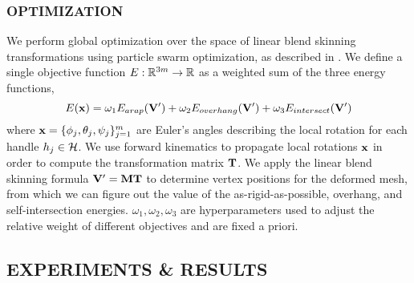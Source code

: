 



\subsubsection*{OPTIMIZATION}

We perform global optimization over the space of linear blend skinning transformations using particle swarm optimization, as described in \cite{jacobson_matryoshka_2017}. We define a single objective function $E: \mathbb{R}^{3m} \to \mathbb{R}$ as a weighted sum of the three energy functions,
\[
    E(\mathbf{x}) = \omega_1 E_{arap}(\mathbf{V}') + \omega_2 E_{overhang}(\mathbf{V}') + \omega_3 E_{intersect}(\mathbf{V}')
\]
where $\mathbf{x} = \{ \phi_j, \theta_j, \psi_j \}_{j=1}^m$ are Euler's angles describing the local rotation for each handle $h_j \in \mathcal{H}$. We use forward kinematics to propagate local rotations $\mathbf{x}$ in order to compute the transformation matrix $\mathbf{T}$. We apply the linear blend skinning formula $\mathbf{V}' = \mathbf{M} \mathbf{T}$ to determine vertex positions for the deformed mesh, from which we can figure out the value of the as-rigid-as-possible, overhang, and self-intersection energies. $\omega_1,\omega_2,\omega_3$ are hyperparameters used to adjust the relative weight of different objectives and are fixed a priori.

\subsection*{EXPERIMENTS \& RESULTS}

